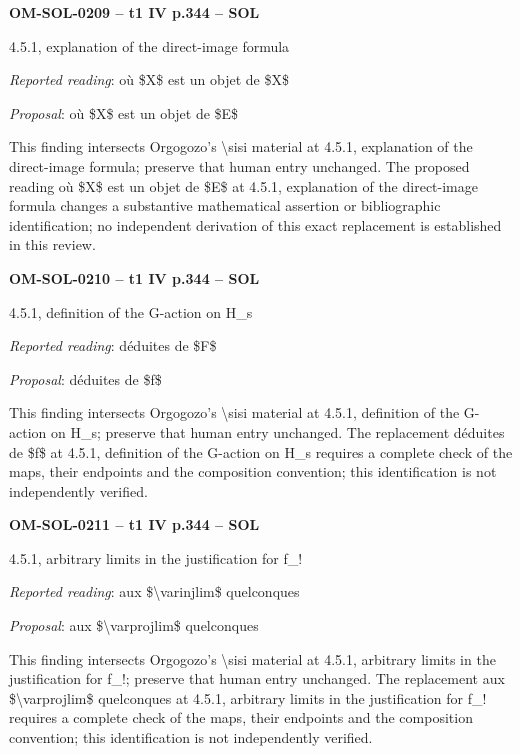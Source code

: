 \par\noindent\textbf{OM-SOL-0209 -- t1 IV p.344 -- SOL}\par
4.5.1, explanation of the direct-image formula\par
\emph{Reported reading}: où \$X\$ est un objet de \$X\$\par
\emph{Proposal}: où \$X\$ est un objet de \$E\$\par
This finding intersects Orgogozo's \textbackslash{}sisi material at 4.5.1, explanation of the direct-image formula; preserve that human entry unchanged. The proposed reading où \$X\$ est un objet de \$E\$ at 4.5.1, explanation of the direct-image formula changes a substantive mathematical assertion or bibliographic identification; no independent derivation of this exact replacement is established in this review.\par
\par\noindent\textbf{OM-SOL-0210 -- t1 IV p.344 -- SOL}\par
4.5.1, definition of the G-action on H\_s\par
\emph{Reported reading}: déduites de \$F\$\par
\emph{Proposal}: déduites de \$f\$\par
This finding intersects Orgogozo's \textbackslash{}sisi material at 4.5.1, definition of the G-action on H\_s; preserve that human entry unchanged. The replacement déduites de \$f\$ at 4.5.1, definition of the G-action on H\_s requires a complete check of the maps, their endpoints and the composition convention; this identification is not independently verified.\par
\par\noindent\textbf{OM-SOL-0211 -- t1 IV p.344 -- SOL}\par
4.5.1, arbitrary limits in the justification for f\_!\par
\emph{Reported reading}: aux \$\textbackslash{}varinjlim\$ quelconques\par
\emph{Proposal}: aux \$\textbackslash{}varprojlim\$ quelconques\par
This finding intersects Orgogozo's \textbackslash{}sisi material at 4.5.1, arbitrary limits in the justification for f\_!; preserve that human entry unchanged. The replacement aux \$\textbackslash{}varprojlim\$ quelconques at 4.5.1, arbitrary limits in the justification for f\_! requires a complete check of the maps, their endpoints and the composition convention; this identification is not independently verified.\par
